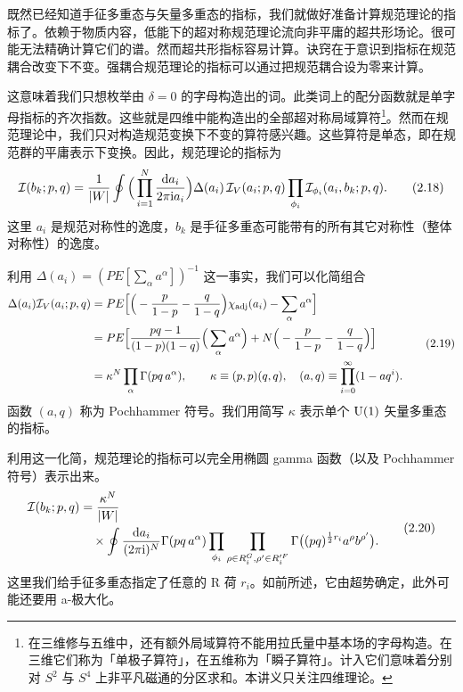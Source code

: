 既然已经知道手征多重态与矢量多重态的指标，我们就做好准备计算规范理论的指标了。依赖于物质内容，低能下的超对称规范理论流向非平庸的超共形场论。很可能无法精确计算它们的谱。然而超共形指标容易计算。诀窍在于意识到指标在规范耦合改变下不变。强耦合规范理论的指标可以通过把规范耦合设为零来计算。

这意味着我们只想枚举由 $\delta=0$ 的字母构造出的词。此类词上的配分函数就是单字母指标的齐次指数。这些就是四维中能构造出的全部超对称局域算符\footnote{在三维修与五维中，还有额外局域算符不能用拉氏量中基本场的字母构造。在三维它们称为「单极子算符」，在五维称为「瞬子算符」。计入它们意味着分别对 $S^2$ 与 $S^4$ 上非平凡磁通的分区求和。本讲义只关注四维理论。}。然而在规范理论中，我们只对构造规范变换下不变的算符感兴趣。这些算符是单态，即在规范群的平庸表示下变换。因此，规范理论的指标为
\[
\mathcal{I}(b_k;p,q)=\frac{1}{|W|}\oint\Big(\prod_{i=1}^{N}\frac{\mathrm{d} a_i}{2\pi\mathrm{i} a_i}\Big)\Delta(a_i)\,\mathcal{I}_V(a_i;p,q)\prod_{\phi_i}\mathcal{I}_{\phi_i}(a_i,b_k;p,q) .
\tag{2.18}
\]
这里 $a_i$ 是规范对称性的逸度，$b_k$ 是手征多重态可能带有的所有其它对称性（整体对称性）的逸度。

利用 $\Delta(a_i)=(PE[\sum_\alpha a^\alpha])^{-1}$ 这一事实，我们可以化简组合
\[
\begin{aligned}
\Delta(a_i)\mathcal{I}_V(a_i;p,q)&=PE\Big[\Big(-\frac{p}{1-p}-\frac{q}{1-q}\Big)\chi_{\operatorname{adj}}(a_i)-\sum_\alpha a^\alpha\Big]\\
&=PE\Big[\frac{pq-1}{(1-p)(1-q)}\Big(\sum_\alpha a^\alpha\Big)+N\Big(-\frac{p}{1-p}-\frac{q}{1-q}\Big)\Big]\\
&=\kappa^N\prod_\alpha\Gamma(pq\,a^\alpha),\qquad \kappa\equiv(p,p)(q,q),\quad (a,q)\equiv\prod_{i=0}^{\infty}(1-aq^i) .
\end{aligned}
\tag{2.19}
\]
函数 $(a,q)$ 称为 Pochhammer 符号。我们用简写 $\kappa$ 表示单个 $\operatorname{U}(1)$ 矢量多重态的指标。

利用这一化简，规范理论的指标可以完全用椭圆 gamma 函数（以及 Pochhammer 符号）表示出来。
\[
\begin{aligned}
\mathcal{I}(b_k;p,q)&=\frac{\kappa^N}{|W|}\\
&\quad\times\oint\frac{\mathrm{d} a_i}{(2\pi\mathrm{i})^N}\Gamma(pq\,a^\alpha)\prod_{\phi_i}\prod_{\rho\in R_i^G,\rho'\in R'^F_i}\Gamma\big((pq)^{\frac12 r_i}a^\rho b^{\rho'}\big) .
\end{aligned}
\tag{2.20}
\]
这里我们给手征多重态指定了任意的 R 荷 $r_i$。如前所述，它由超势确定，此外可能还要用 a-极大化。

